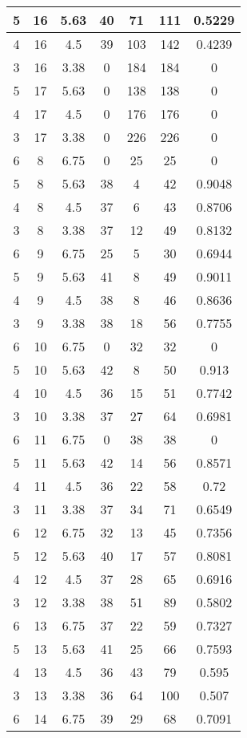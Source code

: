 \documentclass[letterpaper, 12pt]{article}
\begin{document}
\begin{longtable}{|c|c|c|c|c|c|c|}
\hline
5 & 16 & 5.63 & 40 & 71 & 111 & 0.5229 \\
\hline
4 & 16 & 4.5 & 39 & 103 & 142 & 0.4239 \\
\hline
3 & 16 & 3.38 & 0 & 184 & 184 & 0 \\
\hline
5 & 17 & 5.63 & 0 & 138 & 138 & 0 \\
\hline
4 & 17 & 4.5 & 0 & 176 & 176 & 0 \\
\hline
3 & 17 & 3.38 & 0 & 226 & 226 & 0 \\
\hline
6 & 8 & 6.75 & 0 & 25 & 25 & 0 \\
\hline
5 & 8 & 5.63 & 38 & 4 & 42 & 0.9048 \\
\hline
4 & 8 & 4.5 & 37 & 6 & 43 & 0.8706 \\
\hline
3 & 8 & 3.38 & 37 & 12 & 49 & 0.8132 \\
\hline
6 & 9 & 6.75 & 25 & 5 & 30 & 0.6944 \\
\hline
5 & 9 & 5.63 & 41 & 8 & 49 & 0.9011 \\
\hline
4 & 9 & 4.5 & 38 & 8 & 46 & 0.8636 \\
\hline
3 & 9 & 3.38 & 38 & 18 & 56 & 0.7755 \\
\hline
6 & 10 & 6.75 & 0 & 32 & 32 & 0 \\
\hline
5 & 10 & 5.63 & 42 & 8 & 50 & 0.913 \\
\hline
4 & 10 & 4.5 & 36 & 15 & 51 & 0.7742 \\
\hline
3 & 10 & 3.38 & 37 & 27 & 64 & 0.6981 \\
\hline
6 & 11 & 6.75 & 0 & 38 & 38 & 0 \\
\hline
5 & 11 & 5.63 & 42 & 14 & 56 & 0.8571 \\
\hline
4 & 11 & 4.5 & 36 & 22 & 58 & 0.72 \\
\hline
3 & 11 & 3.38 & 37 & 34 & 71 & 0.6549 \\
\hline
6 & 12 & 6.75 & 32 & 13 & 45 & 0.7356 \\
\hline
5 & 12 & 5.63 & 40 & 17 & 57 & 0.8081 \\
\hline
4 & 12 & 4.5 & 37 & 28 & 65 & 0.6916 \\
\hline
3 & 12 & 3.38 & 38 & 51 & 89 & 0.5802 \\
\hline
6 & 13 & 6.75 & 37 & 22 & 59 & 0.7327 \\
\hline
5 & 13 & 5.63 & 41 & 25 & 66 & 0.7593 \\
\hline
4 & 13 & 4.5 & 36 & 43 & 79 & 0.595 \\
\hline
3 & 13 & 3.38 & 36 & 64 & 100 & 0.507 \\
\hline
6 & 14 & 6.75 & 39 & 29 & 68 & 0.7091 \\

\end{longtable}
\end{document}
